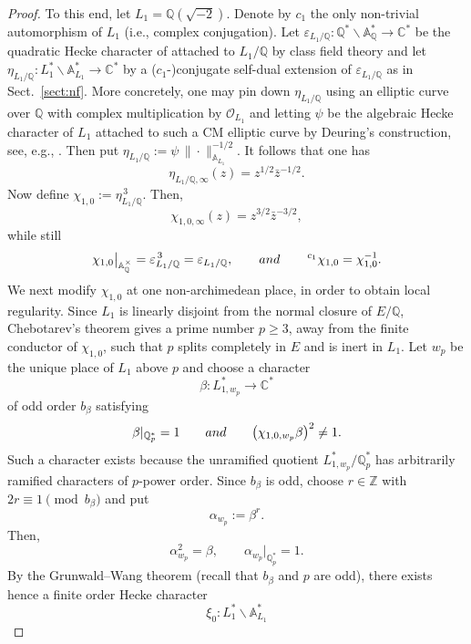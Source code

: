 \documentclass[10pt,a4paper]{amsart}
\def\A{\mathbb A}
\def\C{\mathbb C}
\begin{document}
\begin{proof}
To this end, let $L_1=\mathbb Q(\sqrt{-2})$. Denote by $c_1$ the only non-trivial automorphism of $L_1$ (i.e., complex conjugation). Let $\varepsilon_{L_1/\mathbb Q}: \mathbb Q^*\backslash\mathbb A_\mathbb Q^*\rightarrow\C^*$ be the quadratic Hecke character of attached to
\(L_1/\mathbb Q\) by class field theory and let $\eta_{L_1/\mathbb Q}: L_1^*\backslash \A_{L_1}^*\rightarrow\C^*$ by a ($c_1$-)conjugate self-dual extension of $\varepsilon_{L_1/\mathbb Q}$ as in Sect.\ \ref{sect:nf}. More concretely, one may pin down $\eta_{L_1/\mathbb Q}$ using an elliptic curve over
\(\mathbb Q\) with complex multiplication by \(\mathcal O_{L_1}\) and letting \(\psi\) be the algebraic Hecke character of \(L_1\) attached to such a CM elliptic curve by Deuring's construction, see, e.g., \cite[Chp.\ II, \S\S 9--10]{Sil94}. Then put $\eta_{L_1/\mathbb Q}
        :=
        \psi\,\|\cdot\|_{\mathbb A_{L_1}}^{-1/2}$. It follows that one has
$$
        \eta_{L_1/\mathbb Q,\infty}(z)
        =
        z^{1/2}\bar z^{-1/2}.
$$
Now define $\chi_{1,0}
        :=
        \eta_{L_1/\mathbb Q}^{\,3}.$ Then,
$$
        \chi_{1,0,\infty}(z)
        =
        z^{3/2}\bar z^{-3/2},
$$
while still
$$
        \chi_{1,0}
        \big|_{\mathbb A_\mathbb Q^\times}
        =
        \varepsilon_{L_1/\mathbb Q}^{\,3}
        =
        \varepsilon_{L_1/\mathbb Q},  \quad\quad {\rm and} \quad\quad   {}^{\,c_1} \chi_{1,0}=\chi_{1,0}^{-1}.
$$
We next modify \(\chi_{1,0}\) at one non-archimedean place, in order to obtain local regularity. Since \(L_1\) is linearly disjoint from the normal closure of \(E/\mathbb Q\), Chebotarev's theorem gives a prime number \(p\geq 3\), away from the finite conductor of \(\chi_{1,0}\), such that \(p\) splits completely in \(E\) and is inert in \(L_1\). Let $w_p$ be the unique place of \(L_1\) above \(p\) and choose a character
$$
        \beta:L_{1,w_p}^{*}\longrightarrow\mathbb C^{*}
$$
of odd order $b_\beta$ satisfying
$$
        \beta|_{\mathbb Q_p^*}=1 \quad\quad {\rm and}\quad\quad      \bigl(\chi_{1,0,w_p}\beta\bigr)^2\neq 1.
$$
Such a character exists because the unramified quotient $ L_{1,w_p}^{*}/\mathbb Q_p^*$ has arbitrarily ramified characters of \(p\)-power order. Since \(b_\beta\) is odd, choose
\(r\in\mathbb Z\) with $2r\equiv 1\pmod{b_\beta}$ and put
$$
        \alpha_{w_p}:=\beta^r.
$$
Then,
$$
        \alpha_{w_p}^2=\beta,
        \qquad
        \alpha_{w_p}|_{\mathbb Q_p^*}=1.
$$
By the Grunwald--Wang theorem (recall that $b_\beta$ and $p$ are odd), there exists hence a finite order Hecke character
$$
        \xi_0:L_1^*\backslash \mathbb A_{L_1}^{*}
$$
\end{proof}
\end{document}
